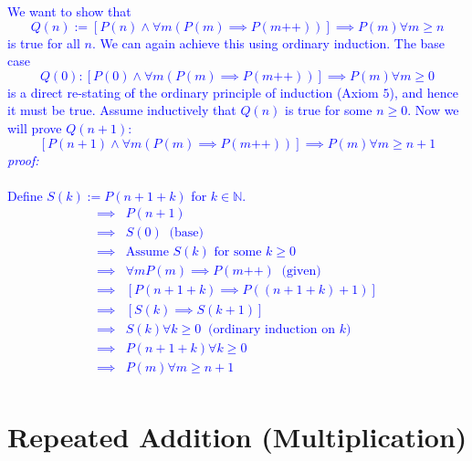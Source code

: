 \documentclass[12pt]{article}
\begin{document}
\begin{enumerate}[leftmargin=*, label=\textbf{\arabic*.}]
	\textcolor{blue}{	We want to show that $$Q(n) := [P(n) \land \forall m (P(m) \implies P(m\text{++}))] \implies P(m) \forall m \geq n$$ is true for all $n$. We can again achieve this using ordinary induction. The base case  $$Q(0) : [P(0) \land \forall m (P(m) \implies P(m\text{++}))] \implies P(m) \forall m \geq 0$$ is a direct re-stating of the ordinary principle of induction (Axiom $5$), and hence it must be true. Assume inductively that $Q(n)$ is true for some $n \geq 0$. Now we will prove $Q(n+1)$: 
	$$[P(n+1) \land \forall m (P(m) \implies P(m\text{++}))] \implies P(m) \forall m \geq n+1$$
	\textit{proof:} \\ \\
	Define $S(k) := P(n+1+k)$ for $k \in \mathbb{N}$.
	\begin{align*}
	[P(n+1) \land \forall m (P(m) \implies P(m\text{++}))] \implies& P(n+1) \\
	\implies& S(0) \;\; \text{(base)} \\
	\implies& \text{Assume $S(k)$ for some $k \geq 0$} \\
	\implies& \forall m P(m) \implies P(m\text{++}) \;\; \text{(given)} \\
	\implies& [P(n+1+k) \implies P((n+1+k) + 1)] \\
	\implies& [S(k) \implies S(k+1)] \\
	\implies& S(k) \forall k \geq 0 \;\; \text{(ordinary induction on $k$)} \\
	\implies& P(n+1+k) \forall k \geq 0\\
	\implies& P(m) \forall m \geq n+1 \\
	\end{align*}
 	}	
\end{enumerate}


\section{Repeated Addition (Multiplication)}
\end{document}
